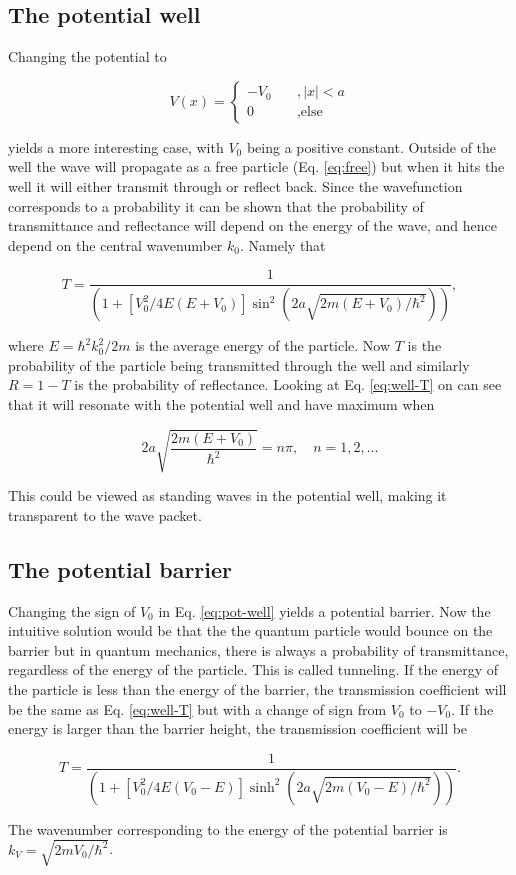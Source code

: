 \subsection{The potential well}

Changing the potential to

\begin{equation}
  \label{eq:pot-well}
  V(x) = \begin{cases}
    -V_0 & \quad , |x|<a \\
    0 & \quad, \text{else}
  \end{cases}
\end{equation}

yields a more interesting case, with $V_0$ being a positive constant. Outside of the well the wave will propagate as a free particle (Eq. \eqref{eq:free}) but when it hits the well it will either transmit through or reflect back. Since the wavefunction corresponds to a probability it can be shown that the probability of transmittance and reflectance will depend on the energy of the wave, and hence depend on the central wavenumber $k_0$. Namely that

\begin{equation}
  \label{eq:well-T}
  T = \frac{1}{ \left( 1+ [V_0^2 /4 E (E+V_0)]\sin^2(2a\sqrt{2m(E+V_0)/\hbar^2})    \right)  },
\end{equation}

where $E =\hbar^2 k_0^2/2m$ is the average energy of the particle\cite{sakurai}. Now $T$ is the probability of the particle being transmitted through the well and similarly $R=1-T$ is the probability of reflectance. Looking at Eq. \ref{eq:well-T} on can see that it will resonate with the potential well and have maximum when

\begin{equation}
  \label{eq:resonance}
  2a\sqrt{\frac{2m(E+V_0)}{\hbar^2}} = n \pi, \quad n= 1,2,...
\end{equation}

This could be viewed as standing waves in the potential well, making it transparent to the wave packet.


\subsection{The potential barrier}

Changing the sign of $V_0$ in Eq. \eqref{eq:pot-well} yields a potential barrier. Now the intuitive solution would be that the the quantum particle would bounce on the barrier but in quantum mechanics, there is always a probability of transmittance, regardless of the energy of the particle. This is called tunneling. If the energy of the particle is less than the energy of the barrier, the transmission coefficient will be the same as Eq. \eqref{eq:well-T} but with a change of sign from $V_0$ to $-V_0$. If the energy is larger than the barrier height, the transmission coefficient will be\cite{sakurai}

\begin{equation}
  \label{eq:barr-T}
  T = \frac{1}{ \left( 1+ [V_0^2/4E(V_0-E)]\sinh^2 (2a\sqrt{2m(V_0-E)/\hbar^2})   \right)  }.
\end{equation}

The wavenumber corresponding to the energy of the potential barrier is $k_V = \sqrt{2mV_0/\hbar^2}$.
